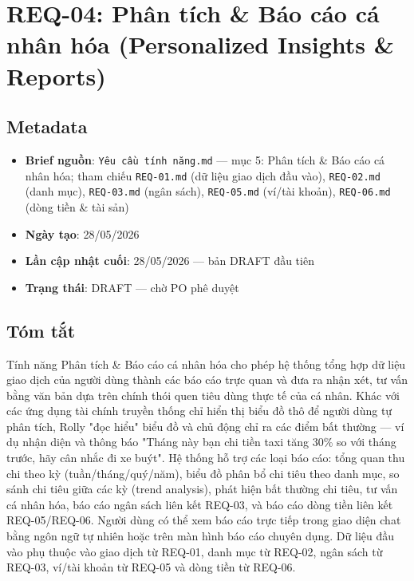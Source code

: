 \section{REQ-04: Phân tích \& Báo cáo cá nhân hóa (Personalized Insights \& Reports)}



\subsection{Metadata}

\begin{itemize}
\item \textbf{Brief nguồn}: \texttt{Yêu cầu tính năng.md} — mục 5: Phân tích \& Báo cáo cá nhân hóa; tham chiếu \texttt{REQ-01.md} (dữ liệu giao dịch đầu vào), \texttt{REQ-02.md} (danh mục), \texttt{REQ-03.md} (ngân sách), \texttt{REQ-05.md} (ví/tài khoản), \texttt{REQ-06.md} (dòng tiền \& tài sản)
\item \textbf{Ngày tạo}: 28/05/2026
\item \textbf{Lần cập nhật cuối}: 28/05/2026 — bản DRAFT đầu tiên
\item \textbf{Trạng thái}: DRAFT — chờ PO phê duyệt
\end{itemize}
\subsection{Tóm tắt}

Tính năng Phân tích \& Báo cáo cá nhân hóa cho phép hệ thống tổng hợp dữ liệu giao dịch của người dùng thành các báo cáo trực quan và đưa ra nhận xét, tư vấn bằng văn bản dựa trên chính thói quen tiêu dùng thực tế của cá nhân. Khác với các ứng dụng tài chính truyền thống chỉ hiển thị biểu đồ thô để người dùng tự phân tích, Rolly "đọc hiểu" biểu đồ và chủ động chỉ ra các điểm bất thường — ví dụ nhận diện và thông báo "Tháng này bạn chi tiền taxi tăng 30\% so với tháng trước, hãy cân nhắc đi xe buýt". Hệ thống hỗ trợ các loại báo cáo: tổng quan thu chi theo kỳ (tuần/tháng/quý/năm), biểu đồ phân bổ chi tiêu theo danh mục, so sánh chi tiêu giữa các kỳ (trend analysis), phát hiện bất thường chi tiêu, tư vấn cá nhân hóa, báo cáo ngân sách liên kết REQ-03, và báo cáo dòng tiền liên kết REQ-05/REQ-06. Người dùng có thể xem báo cáo trực tiếp trong giao diện chat bằng ngôn ngữ tự nhiên hoặc trên màn hình báo cáo chuyên dụng. Dữ liệu đầu vào phụ thuộc vào giao dịch từ REQ-01, danh mục từ REQ-02, ngân sách từ REQ-03, ví/tài khoản từ REQ-05 và dòng tiền từ REQ-06.



